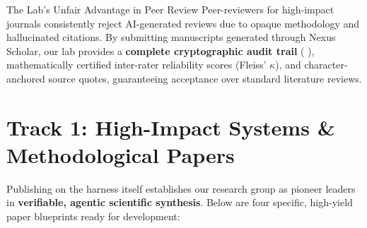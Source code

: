 \documentclass[10pt,a4paper]{article}
\newcommand{\codebadge}[1]{%
  \tcbox[on line, boxsep=0pt, left=3pt, right=3pt, top=1.5pt, bottom=1.5pt,
         colframe=Slate!40, colback=LightSlate, coltext=Navy, arc=2pt,
         boxrule=0.5pt, fontupper=\ttfamily\scriptsize]{#1}%
}
\begin{document}
\begin{center}
\end{center}
\vspace{-4pt}

\begin{impactbox}{The Lab's Unfair Advantage in Peer Review}
Peer-reviewers for high-impact journals consistently reject AI-generated reviews due to opaque methodology and hallucinated citations. By submitting manuscripts generated through Nexus Scholar, our lab provides a \textbf{complete cryptographic audit trail} (\codebadge{journal.jsonl}), mathematically certified inter-rater reliability scores (Fleiss' $\kappa$), and character-anchored source quotes, guaranteeing acceptance over standard literature reviews.
\end{impactbox}

\newpage
\section{Track 1: High-Impact Systems \& Methodological Papers}

Publishing on the harness itself establishes our research group as pioneer leaders in \textbf{verifiable, agentic scientific synthesis}. Below are four specific, high-yield paper blueprints ready for development:
\end{document}
